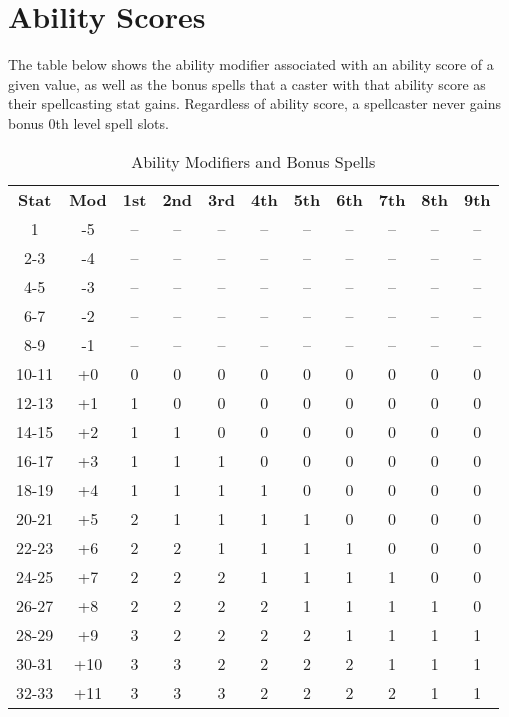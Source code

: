 \section{Ability Scores}

The table below shows the ability modifier associated with an ability score of a given value, as well as the bonus spells that a caster with that ability score as their spellcasting stat gains. Regardless of ability score, a spellcaster never gains bonus 0th level spell slots.

\begin{table}[htb]
\caption{Ability Modifiers and Bonus Spells}
\centering
\begin{tabular}{*{11}{c}}
\textbf{Stat} & \textbf{Mod} & \textbf{1st} & \textbf{2nd} & \textbf{3rd} & \textbf{4th} & \textbf{5th} & \textbf{6th} & \textbf{7th} & \textbf{8th} & \textbf{9th}\\
1 & -5 & -- & -- & -- & -- & -- & -- & -- & -- & -- \\
2-3 & -4 & -- & -- & -- & -- & -- & -- & -- & -- & -- \\
4-5 & -3 & -- & -- & -- & -- & -- & -- & -- & -- & -- \\
6-7 & -2 & -- & -- & -- & -- & -- & -- & -- & -- & -- \\
8-9 & -1 & -- & -- & -- & -- & -- & -- & -- & -- & -- \\
10-11 & +0 & 0 & 0 & 0 & 0 & 0 & 0 & 0 & 0 & 0\\
12-13 & +1 & 1 & 0 & 0 & 0 & 0 & 0 & 0 & 0 & 0\\
14-15 & +2 & 1 & 1 & 0 & 0 & 0 & 0 & 0 & 0 & 0\\
16-17 & +3 & 1 & 1 & 1 & 0 & 0 & 0 & 0 & 0 & 0\\
18-19 & +4 & 1 & 1 & 1 & 1 & 0 & 0 & 0 & 0 & 0\\
20-21 & +5 & 2 & 1 & 1 & 1 & 1 & 0 & 0 & 0 & 0\\
22-23 & +6 & 2 & 2 & 1 & 1 & 1 & 1 & 0 & 0 & 0\\
24-25 & +7 & 2 & 2 & 2 & 1 & 1 & 1 & 1 & 0 & 0\\
26-27 & +8 & 2 & 2 & 2 & 2 & 1 & 1 & 1 & 1 & 0\\
28-29 & +9 & 3 & 2 & 2 & 2 & 2 & 1 & 1 & 1 & 1\\
30-31 & +10 & 3 & 3 & 2 & 2 & 2 & 2 & 1 & 1 & 1\\
32-33 & +11 & 3 & 3 & 3 & 2 & 2 & 2 & 2 & 1 & 1\\

\end{tabular}
\end{table}
